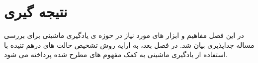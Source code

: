 \section{نتیجه گیری}
در این فصل مفاهیم و ابزار های مورد نیاز در حوزه ی یادگیری ماشینی برای بررسی مساله جداپذیری بیان شد. در فصل بعد، به ارایه روش تشخیص حالت های درهم تنیده با استفاده از یادگیری ماشینی  به کمک مفهوم های مطرح شده پرداخته می شود.
